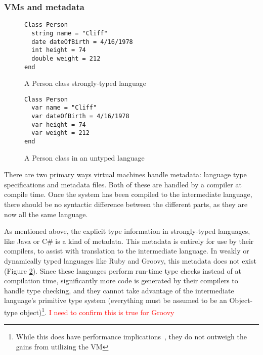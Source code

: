 \documentclass{sig-alternate}
\newcommand{\mycomment}[1]{\textcolor{red}{#1}}
\begin{document}
\subsubsection*{VMs and metadata}

\begin{figure}
\begin{verbatim}
Class Person
  string name = "Cliff"
  date dateOfBirth = 4/16/1978
  int height = 74
  double weight = 212
end
\end{verbatim}
\caption{A Person class strongly-typed language}
\label{typedExample}
\end{figure}

\begin{figure}
\begin{verbatim}
Class Person
  var name = "Cliff"
  var dateOfBirth = 4/16/1978
  var height = 74
  var weight = 212
end
\end{verbatim}
\caption{A Person class in an untyped language}
\label{untypedExample}
\end{figure}





There are two primary ways virtual machines handle metadata: language type specifications and metadata files. Both of these are handled by a compiler at compile time.
Once the system has been compiled to the intermediate language, there should be no syntactic difference between the different parts, as they are now all the same language.

As mentioned above, the explicit type information in strongly-typed languages, like Java or C\# is a kind of metadata. This metadata is entirely for use by their compilers, to assist with translation to the intermediate language.
In weakly or dynamically typed languages like Ruby and Groovy, this metadata does not exist (Figure \ref{untypedExample}). Since these languages perform run-time type checks instead of at compilation time, significantly more code is generated by their compilers to handle type checking, and they cannot take advantage of the intermediate language's primitive type system (everything must be assumed to be an Object-type object)\footnote{While this does have performance implications~\cite{Li:2013}, they do not outweigh the gains from utilizing the VM}.
\mycomment{I need to confirm this is true for Groovy}
\end{document}

